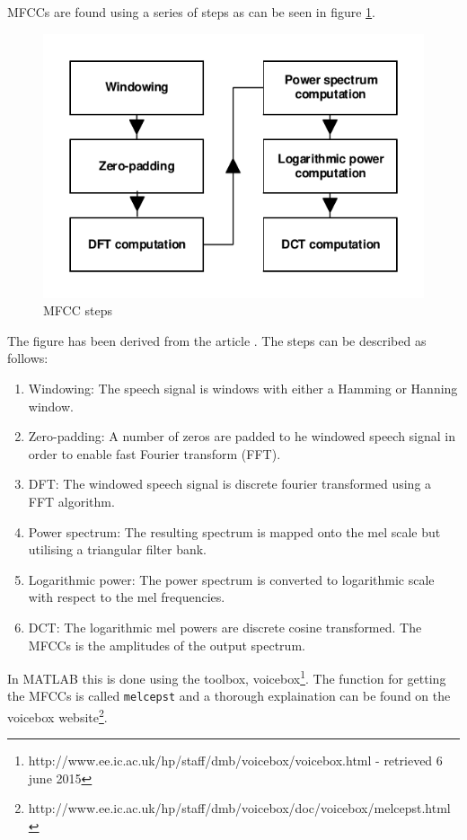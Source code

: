 MFCCs are found using a series of steps as can be seen in figure \ref{fig:MFCCsteps}.
\begin{figure}[H]
\centering
\includegraphics[scale=1]{billeder/MFCCsteps}
\caption{MFCC steps}
\label{fig:MFCCsteps}
\end{figure}
The figure has been derived from the article \cite{Sahidullah2012}. The steps can be described as follows:
\begin{enumerate}
\item Windowing: The speech signal is windows with either a Hamming or Hanning window.
\item Zero-padding: A number of zeros are padded to he windowed speech signal in order to enable fast Fourier transform (FFT).
\item DFT: The windowed speech signal is discrete fourier transformed using a FFT algorithm.
\item Power spectrum: The resulting spectrum is mapped onto the mel scale but utilising a triangular filter bank.
\item Logarithmic power: The power spectrum is converted to logarithmic scale with respect to the mel frequencies.
\item DCT: The logarithmic mel powers are discrete cosine transformed. The MFCCs is the amplitudes of the output spectrum.
\end{enumerate}

In MATLAB this is done using the toolbox, voicebox\footnote{http://www.ee.ic.ac.uk/hp/staff/dmb/voicebox/voicebox.html - retrieved 6 june 2015}. The function for getting the MFCCs is called \texttt{melcepst} and a thorough explaination can be found on the voicebox website\footnote{http://www.ee.ic.ac.uk/hp/staff/dmb/voicebox/doc/voicebox/melcepst.html}. 

